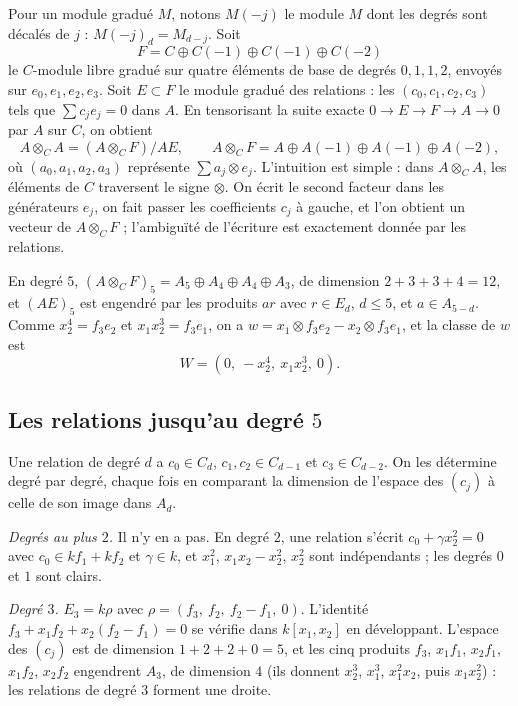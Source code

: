 \documentclass[11pt,a4paper]{amsart}
\theoremstyle{definition}
\theoremstyle{plain}
\theoremstyle{remark}
\begin{document}
Pour un module gradué $M$, notons $M(-j)$ le module $M$ dont les degrés sont décalés de $j$ : $M(-j)_d = M_{d-j}$. Soit
\[
F = C \oplus C(-1) \oplus C(-1) \oplus C(-2)
\]
le $C$-module libre gradué sur quatre éléments de base de degrés $0, 1, 1, 2$, envoyés sur $e_0, e_1, e_2, e_3$. Soit $E \subset F$ le module gradué des relations : les $(c_0, c_1, c_2, c_3)$ tels que $\sum c_j e_j = 0$ dans $A$. En tensorisant la suite exacte $0 \to E \to F \to A \to 0$ par $A$ sur $C$, on obtient
\[
A \otimes_C A = (A \otimes_C F) / A E, \qquad A \otimes_C F = A \oplus A(-1) \oplus A(-1) \oplus A(-2),
\]
où $(a_0, a_1, a_2, a_3)$ représente $\sum a_j \otimes e_j$. L'intuition est simple : dans $A \otimes_C A$, les éléments de $C$ traversent le signe $\otimes$. On écrit le second facteur dans les générateurs $e_j$, on fait passer les coefficients $c_j$ à gauche, et l'on obtient un vecteur de $A \otimes_C F$ ; l'ambiguïté de l'écriture est exactement donnée par les relations.

En degré $5$, $(A \otimes_C F)_5 = A_5 \oplus A_4 \oplus A_4 \oplus A_3$, de dimension $2 + 3 + 3 + 4 = 12$, et $(AE)_5$ est engendré par les produits $ar$ avec $r \in E_d$, $d \le 5$, et $a \in A_{5-d}$. Comme $x_2^4 = f_3e_2$ et $x_1x_2^3 = f_3e_1$, on a $w = x_1 \otimes f_3e_2 - x_2 \otimes f_3e_1$, et la classe de $w$ est
\[
W = (0,\ -x_2^4,\ x_1x_2^3,\ 0).
\]

\subsection{Les relations jusqu'au degré $5$}

Une relation de degré $d$ a $c_0 \in C_d$, $c_1, c_2 \in C_{d-1}$ et $c_3 \in C_{d-2}$. On les détermine degré par degré, chaque fois en comparant la dimension de l'espace des $(c_j)$ à celle de son image dans $A_d$.

\emph{Degrés au plus $2$.} Il n'y en a pas. En degré $2$, une relation s'écrit $c_0 + \gamma x_2^2 = 0$ avec $c_0 \in kf_1 + kf_2$ et $\gamma \in k$, et $x_1^2$, $x_1x_2 - x_2^2$, $x_2^2$ sont indépendants ; les degrés $0$ et $1$ sont clairs.

\emph{Degré $3$.} $E_3 = k\rho$ avec $\rho = (f_3,\ f_2,\ f_2 - f_1,\ 0)$. L'identité $f_3 + x_1f_2 + x_2(f_2 - f_1) = 0$ se vérifie dans $k[x_1, x_2]$ en développant. L'espace des $(c_j)$ est de dimension $1 + 2 + 2 + 0 = 5$, et les cinq produits $f_3$, $x_1f_1$, $x_2f_1$, $x_1f_2$, $x_2f_2$ engendrent $A_3$, de dimension $4$ (ils donnent $x_2^3$, $x_1^3$, $x_1^2x_2$, puis $x_1x_2^2$) : les relations de degré $3$ forment une droite.
\end{document}
